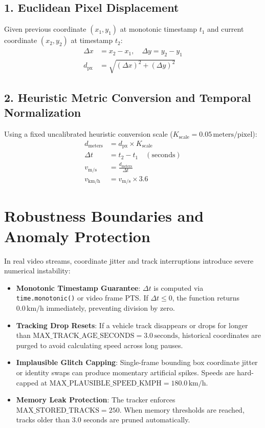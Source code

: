 \documentclass[11pt,a4paper,oneside]{report}
\begin{document}
\subsection{1. Euclidean Pixel Displacement}
Given previous coordinate $(x_1, y_1)$ at monotonic timestamp $t_1$ and current coordinate $(x_2, y_2)$ at timestamp $t_2$:
\begin{align}
\Delta x &= x_2 - x_1, \quad \Delta y = y_2 - y_1 \\
d_{\text{px}} &= \sqrt{(\Delta x)^2 + (\Delta y)^2}
\end{align}

\subsection{2. Heuristic Metric Conversion and Temporal Normalization}
Using a fixed uncalibrated heuristic conversion scale ($K_{\text{scale}} = 0.05\,\text{meters/pixel}$):
\begin{align}
d_{\text{meters}} &= d_{\text{px}} \times K_{\text{scale}} \\
\Delta t &= t_2 - t_1 \quad (\text{seconds}) \\
v_{\text{m/s}} &= \frac{d_{\text{meters}}}{\Delta t} \\
v_{\text{km/h}} &= v_{\text{m/s}} \times 3.6
\end{align}

\section{Robustness Boundaries and Anomaly Protection}
In real video streams, coordinate jitter and track interruptions introduce severe numerical instability:
\begin{itemize}[leftmargin=*]
    \item \textbf{Monotonic Timestamp Guarantee}: $\Delta t$ is computed via \texttt{time.monotonic()} or video frame PTS. If $\Delta t \le 0$, the function returns $0.0\,\text{km/h}$ immediately, preventing division by zero.
    \item \textbf{Tracking Drop Resets}: If a vehicle track disappears or drops for longer than $\text{MAX\_TRACK\_AGE\_SECONDS} = 3.0\,\text{seconds}$, historical coordinates are purged to avoid calculating speed across long pauses.
    \item \textbf{Implausible Glitch Capping}: Single-frame bounding box coordinate jitter or identity swaps can produce momentary artificial spikes. Speeds are hard-capped at $\text{MAX\_PLAUSIBLE\_SPEED\_KMPH} = 180.0\,\text{km/h}$.
    \item \textbf{Memory Leak Protection}: The tracker enforces $\text{MAX\_STORED\_TRACKS} = 250$. When memory thresholds are reached, tracks older than 3.0 seconds are pruned automatically.
\end{itemize}
\end{document}
